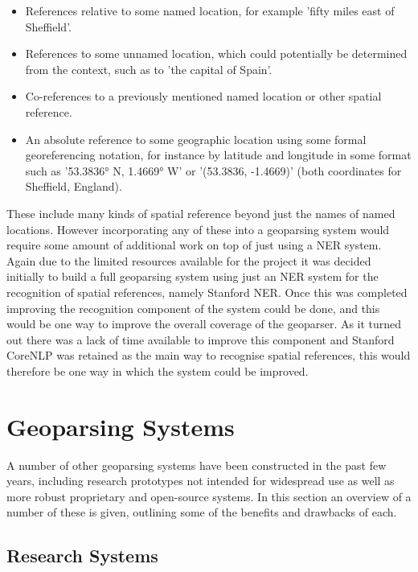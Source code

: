 \documentclass[12pt, a4paper]{report}
\begin{document}
\begin{itemize}
	\item { References relative to some named location, for example 'fifty miles east of Sheffield'. }
	\item { References to some unnamed location, which could potentially be determined from the context, such as to 'the capital of Spain'.}
	\item { Co-references to a previously mentioned named location or other spatial reference. }
	\item { An absolute reference to some geographic location using some formal georeferencing notation, for instance by latitude and longitude in some format such as '53.3836° N, 1.4669° W' or '(53.3836, -1.4669)' (both coordinates for Sheffield, England). }
\end{itemize}

These include many kinds of spatial reference beyond just the names of named locations. However incorporating any of these into a geoparsing system would require some amount of additional work on top of just using a NER system. Again due to the limited resources available for the project it was decided initially to build a full geoparsing system using just an NER system for the recognition of spatial references, namely Stanford NER. Once this was completed improving the recognition component of the system could be done, and this would be one way to improve the overall coverage of the geoparser. As it turned out there was a lack of time available to improve this component and Stanford CoreNLP was retained as the main way to recognise spatial references, this would therefore be one way in which the system could be improved.

\section{Geoparsing Systems}
\label{sec:geoparsing_systems}

A number of other geoparsing systems have been constructed in the past few years, including research prototypes not intended for widespread use as well as more robust proprietary and open-source systems. In this section an overview of a number of these is given, outlining some of the benefits and drawbacks of each.

\subsection{Research Systems}
\label{subsec:research_systems}
\end{document}

